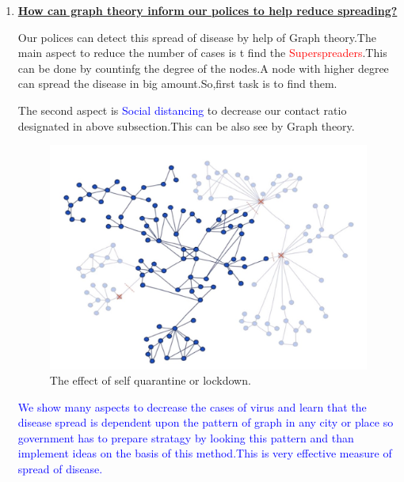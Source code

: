 \documentclass[12pt]{article}
\begin{document}
{\begin{enumerate}
\begin{tcolorbox}[enhanced,fit to height=4cm,
  colback=yellow!25!black!10!yellow,colframe=green!75!white,title=\textcolor{red}{Conclusion:2},
  drop fuzzy shadow]
  \textcolor{blue}{Here,in above given figure connection pattern tells lots more about the Susceptible and infectives .This is the main reason that why particular area or city has more cases of virus than other.} 
\end{tcolorbox}
\newpage
\item{\underline{\bf{ How can graph theory inform our polices to help reduce spreading?}}}
\\
\par Our polices can detect this spread of disease by help of Graph theory.The main aspect to reduce the number of cases is t find the \textcolor{red}{Superspreaders}.This can be done by countinfg the degree of the nodes.A node with higher degree can spread the disease in big amount.So,first task is to find them.
\\
\par The second aspect is \textcolor{blue}{Social distancing} to decrease our contact ratio designated in above subsection.This can be also see by Graph theory.\\

\begin{figure}[H]
\includegraphics[width=\textwidth]{quarantine (2).jpeg}
\caption{The effect of self quarantine or lockdown.}
\end{figure}
\begin{tcolorbox}[enhanced,fit to height=4cm,
  colback=yellow!25!black!10!yellow,colframe=green!75!white,title=\textcolor{red}{Conclusion:3},
  drop fuzzy shadow]
  \textcolor{blue}{We show many aspects to decrease the cases of virus and learn that the disease spread is dependent upon the pattern of graph in any city or place so government has to prepare stratagy by looking this pattern and than implement ideas on the basis of this method.This is very effective measure of spread of disease.} 
\end{tcolorbox}


\end{enumerate}}
\end{document}
